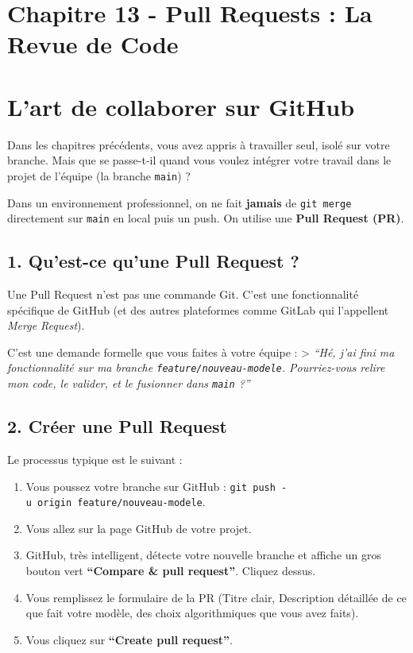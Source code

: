 \documentclass[
  letterpaper,
  DIV=11,
  numbers=noendperiod]{scrreprt}
\providecommand{\tightlist}{%
  \setlength{\itemsep}{0pt}\setlength{\parskip}{0pt}}
\begin{document}

\section{Chapitre 13 - Pull Requests : La Revue de
Code}\label{chapitre-13---pull-requests-la-revue-de-code}


\section{L'art de collaborer sur
GitHub}\label{lart-de-collaborer-sur-github}

Dans les chapitres précédents, vous avez appris à travailler seul, isolé
sur votre branche. Mais que se passe-t-il quand vous voulez intégrer
votre travail dans le projet de l'équipe (la branche \texttt{main}) ?

Dans un environnement professionnel, on ne fait \textbf{jamais} de
\texttt{git\ merge} directement sur \texttt{main} en local puis un push.
On utilise une \textbf{Pull Request (PR)}.

\subsection{1. Qu'est-ce qu'une Pull Request
?}\label{quest-ce-quune-pull-request}

Une Pull Request n'est pas une commande Git. C'est une fonctionnalité
spécifique de GitHub (et des autres plateformes comme GitLab qui
l'appellent \emph{Merge Request}).

C'est une demande formelle que vous faites à votre équipe :
\textgreater{} \emph{``Hé, j'ai fini ma fonctionnalité sur ma branche
\texttt{feature/nouveau-modele}. Pourriez-vous relire mon code, le
valider, et le fusionner dans \texttt{main} ?''}

\subsection{2. Créer une Pull Request}\label{cruxe9er-une-pull-request}

Le processus typique est le suivant :

\begin{enumerate}
\def\labelenumi{\arabic{enumi}.}
\tightlist
\item
  Vous poussez votre branche sur GitHub :
  \texttt{git\ push\ -u\ origin\ feature/nouveau-modele}.
\item
  Vous allez sur la page GitHub de votre projet.
\item
  GitHub, très intelligent, détecte votre nouvelle branche et affiche un
  gros bouton vert \textbf{``Compare \& pull request''}. Cliquez dessus.
\item
  Vous remplissez le formulaire de la PR (Titre clair, Description
  détaillée de ce que fait votre modèle, des choix algorithmiques que
  vous avez faits).
\item
  Vous cliquez sur \textbf{``Create pull request''}.
\end{enumerate}
\end{document}
